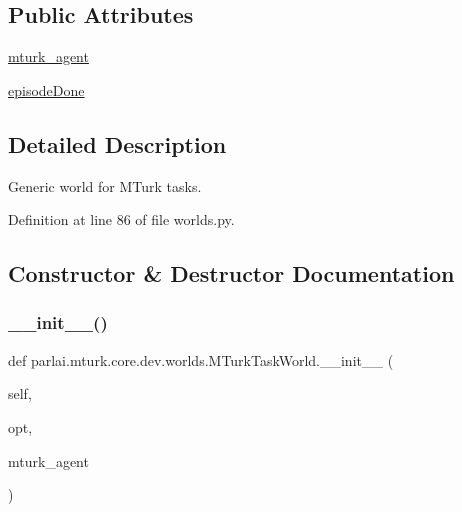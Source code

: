 \subsection*{Public Attributes}
\begin{DoxyCompactItemize}
\item 
\hyperlink{classparlai_1_1mturk_1_1core_1_1dev_1_1worlds_1_1MTurkTaskWorld_ac57f970ab26bb0526c73c03c1b8cad70}{mturk\+\_\+agent}
\item 
\hyperlink{classparlai_1_1mturk_1_1core_1_1dev_1_1worlds_1_1MTurkTaskWorld_a31c19dded93517b4a840dbba6dbb6612}{episode\+Done}
\end{DoxyCompactItemize}


\subsection{Detailed Description}
\begin{DoxyVerb}Generic world for MTurk tasks.\end{DoxyVerb}
 

Definition at line 86 of file worlds.\+py.



\subsection{Constructor \& Destructor Documentation}
\mbox{\label{classparlai_1_1mturk_1_1core_1_1dev_1_1worlds_1_1MTurkTaskWorld_a05dadf953dc8d31e3ab9251abb97d591}} 
\subsubsection{\texorpdfstring{\+\_\+\+\_\+init\+\_\+\+\_\+()}{\_\_init\_\_()}}
{\footnotesize\ttfamily def parlai.\+mturk.\+core.\+dev.\+worlds.\+M\+Turk\+Task\+World.\+\_\+\+\_\+init\+\_\+\+\_\+ (\begin{DoxyParamCaption}\item[{}]{self,  }\item[{}]{opt,  }\item[{}]{mturk\+\_\+agent }\end{DoxyParamCaption})}

